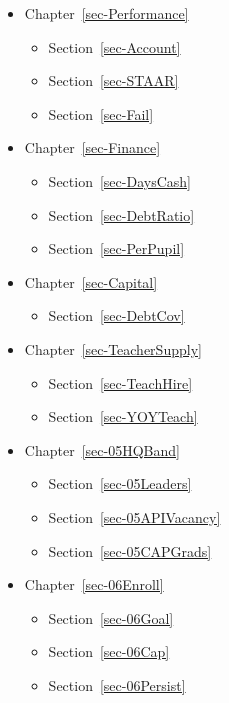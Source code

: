 \documentclass[
  letterpaper,
  DIV=11,
  numbers=noendperiod]{scrreprt}
\providecommand{\tightlist}{%
  \setlength{\itemsep}{0pt}\setlength{\parskip}{0pt}}
\begin{document}
\begin{itemize}
\tightlist
\item
  Chapter~\ref{sec-Performance}

  \begin{itemize}
  \tightlist
  \item
    Section~\ref{sec-Account}
  \item
    Section~\ref{sec-STAAR}
  \item
    Section~\ref{sec-Fail}
  \end{itemize}
\item
  Chapter~\ref{sec-Finance}

  \begin{itemize}
  \tightlist
  \item
    Section~\ref{sec-DaysCash}
  \item
    Section~\ref{sec-DebtRatio}
  \item
    Section~\ref{sec-PerPupil}
  \end{itemize}
\item
  Chapter~\ref{sec-Capital}

  \begin{itemize}
  \tightlist
  \item
    Section~\ref{sec-DebtCov}
  \end{itemize}
\item
  Chapter~\ref{sec-TeacherSupply}

  \begin{itemize}
  \tightlist
  \item
    Section~\ref{sec-TeachHire}
  \item
    Section~\ref{sec-YOYTeach}
  \end{itemize}
\item
  Chapter~\ref{sec-05HQBand}

  \begin{itemize}
  \tightlist
  \item
    Section~\ref{sec-05Leaders}
  \item
    Section~\ref{sec-05APIVacancy}
  \item
    Section~\ref{sec-05CAPGrads}
  \end{itemize}
\item
  Chapter~\ref{sec-06Enroll}

  \begin{itemize}
  \tightlist
  \item
    Section~\ref{sec-06Goal}
  \item
    Section~\ref{sec-06Cap}
  \item
    Section~\ref{sec-06Persist}
  \end{itemize}
\end{itemize}
\end{document}
